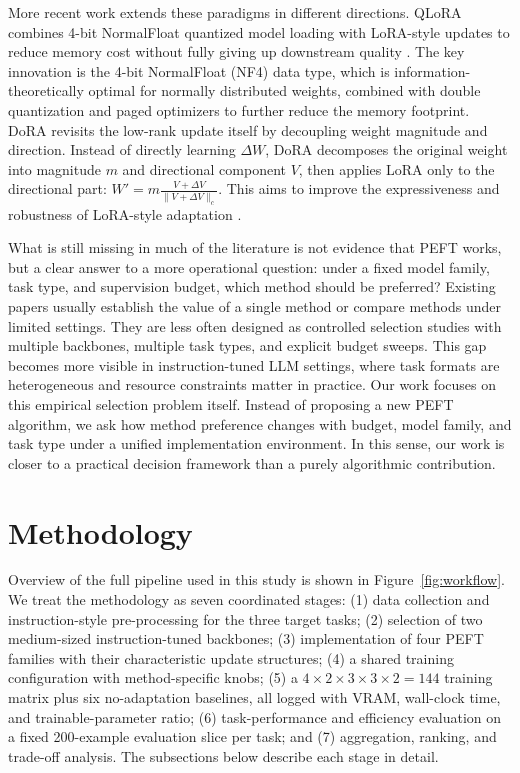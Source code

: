 \documentclass{article}
\begin{document}
More recent work extends these paradigms in different directions. QLoRA combines 4-bit NormalFloat quantized model loading with LoRA-style updates to reduce memory cost without fully giving up downstream quality \cite{dettmers2023qlora}. The key innovation is the 4-bit NormalFloat (NF4) data type, which is information-theoretically optimal for normally distributed weights, combined with double quantization and paged optimizers to further reduce the memory footprint. DoRA revisits the low-rank update itself by decoupling weight magnitude and direction. Instead of directly learning $\Delta W$, DoRA decomposes the original weight into magnitude $m$ and directional component $V$, then applies LoRA only to the directional part: $W' = m \frac{V + \Delta V}{\|V + \Delta V\|_c}$. This aims to improve the expressiveness and robustness of LoRA-style adaptation \cite{liu2024dora}.

What is still missing in much of the literature is not evidence that PEFT works, but a clear answer to a more operational question: under a fixed model family, task type, and supervision budget, which method should be preferred? Existing papers usually establish the value of a single method or compare methods under limited settings. They are less often designed as controlled selection studies with multiple backbones, multiple task types, and explicit budget sweeps. This gap becomes more visible in instruction-tuned LLM settings, where task formats are heterogeneous and resource constraints matter in practice. Our work focuses on this empirical selection problem itself. Instead of proposing a new PEFT algorithm, we ask how method preference changes with budget, model family, and task type under a unified implementation environment. In this sense, our work is closer to a practical decision framework than a purely algorithmic contribution.

\section{Methodology}

 Overview of the full pipeline used in this study is shown in Figure~\ref{fig:workflow}. We treat the methodology as seven coordinated stages: (1) data collection and instruction-style pre-processing for the three target tasks; (2) selection of two medium-sized instruction-tuned backbones; (3) implementation of four PEFT families with their characteristic update structures; (4) a shared training configuration with method-specific knobs; (5) a $4 \times 2 \times 3 \times 3 \times 2 = 144$ training matrix plus six no-adaptation baselines, all logged with VRAM, wall-clock time, and trainable-parameter ratio; (6) task-performance and efficiency evaluation on a fixed 200-example evaluation slice per task; and (7) aggregation, ranking, and trade-off analysis. The subsections below describe each stage in detail.
\end{document}
